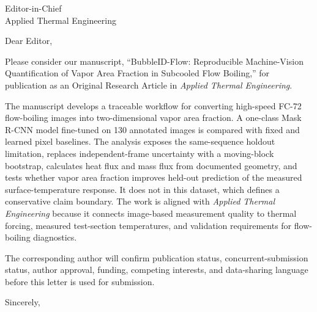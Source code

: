 \documentclass[12pt]{letter}
\begin{document}
\begin{letter}{Editor-in-Chief\\Applied Thermal Engineering}

\opening{Dear Editor,}

Please consider our manuscript, ``BubbleID-Flow: Reproducible Machine-Vision Quantification of Vapor Area Fraction in Subcooled Flow Boiling,'' for publication as an Original Research Article in \textit{Applied Thermal Engineering}.

The manuscript develops a traceable workflow for converting high-speed FC-72 flow-boiling images into two-dimensional vapor area fraction. A one-class Mask R-CNN model fine-tuned on 130 annotated images is compared with fixed and learned pixel baselines. The analysis exposes the same-sequence holdout limitation, replaces independent-frame uncertainty with a moving-block bootstrap, calculates heat flux and mass flux from documented geometry, and tests whether vapor area fraction improves held-out prediction of the measured surface-temperature response. It does not in this dataset, which defines a conservative claim boundary. The work is aligned with \textit{Applied Thermal Engineering} because it connects image-based measurement quality to thermal forcing, measured test-section temperatures, and validation requirements for flow-boiling diagnostics.

The corresponding author will confirm publication status, concurrent-submission status, author approval, funding, competing interests, and data-sharing language before this letter is used for submission.

\closing{Sincerely,}

\end{letter}
\end{document}
